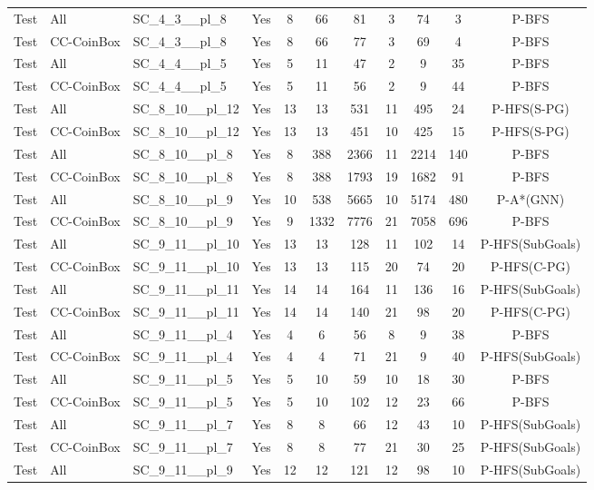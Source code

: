 \documentclass{article}
\begin{document}
\begin{tabular}{lllcccccccc}
Test & All & SC\_4\_3\_\_pl\_8 & Yes & 8 & 66 & 81 & 3 & 74 & 3 & P-BFS \\
Test & CC-CoinBox & SC\_4\_3\_\_pl\_8 & Yes & 8 & 66 & 77 & 3 & 69 & 4 & P-BFS \\
Test & All & SC\_4\_4\_\_pl\_5 & Yes & 5 & 11 & 47 & 2 & 9 & 35 & P-BFS \\
Test & CC-CoinBox & SC\_4\_4\_\_pl\_5 & Yes & 5 & 11 & 56 & 2 & 9 & 44 & P-BFS \\
Test & All & SC\_8\_10\_\_pl\_12 & Yes & 13 & 13 & 531 & 11 & 495 & 24 & P-HFS(S-PG) \\
Test & CC-CoinBox & SC\_8\_10\_\_pl\_12 & Yes & 13 & 13 & 451 & 10 & 425 & 15 & P-HFS(S-PG) \\
Test & All & SC\_8\_10\_\_pl\_8 & Yes & 8 & 388 & 2366 & 11 & 2214 & 140 & P-BFS \\
Test & CC-CoinBox & SC\_8\_10\_\_pl\_8 & Yes & 8 & 388 & 1793 & 19 & 1682 & 91 & P-BFS \\
Test & All & SC\_8\_10\_\_pl\_9 & Yes & 10 & 538 & 5665 & 10 & 5174 & 480 & P-A*(GNN) \\
Test & CC-CoinBox & SC\_8\_10\_\_pl\_9 & Yes & 9 & 1332 & 7776 & 21 & 7058 & 696 & P-BFS \\
Test & All & SC\_9\_11\_\_pl\_10 & Yes & 13 & 13 & 128 & 11 & 102 & 14 & P-HFS(SubGoals) \\
Test & CC-CoinBox & SC\_9\_11\_\_pl\_10 & Yes & 13 & 13 & 115 & 20 & 74 & 20 & P-HFS(C-PG) \\
Test & All & SC\_9\_11\_\_pl\_11 & Yes & 14 & 14 & 164 & 11 & 136 & 16 & P-HFS(SubGoals) \\
Test & CC-CoinBox & SC\_9\_11\_\_pl\_11 & Yes & 14 & 14 & 140 & 21 & 98 & 20 & P-HFS(C-PG) \\
Test & All & SC\_9\_11\_\_pl\_4 & Yes & 4 & 6 & 56 & 8 & 9 & 38 & P-BFS \\
Test & CC-CoinBox & SC\_9\_11\_\_pl\_4 & Yes & 4 & 4 & 71 & 21 & 9 & 40 & P-HFS(SubGoals) \\
Test & All & SC\_9\_11\_\_pl\_5 & Yes & 5 & 10 & 59 & 10 & 18 & 30 & P-BFS \\
Test & CC-CoinBox & SC\_9\_11\_\_pl\_5 & Yes & 5 & 10 & 102 & 12 & 23 & 66 & P-BFS \\
Test & All & SC\_9\_11\_\_pl\_7 & Yes & 8 & 8 & 66 & 12 & 43 & 10 & P-HFS(SubGoals) \\
Test & CC-CoinBox & SC\_9\_11\_\_pl\_7 & Yes & 8 & 8 & 77 & 21 & 30 & 25 & P-HFS(SubGoals) \\
Test & All & SC\_9\_11\_\_pl\_9 & Yes & 12 & 12 & 121 & 12 & 98 & 10 & P-HFS(SubGoals) \\

\end{tabular}
\end{document}
